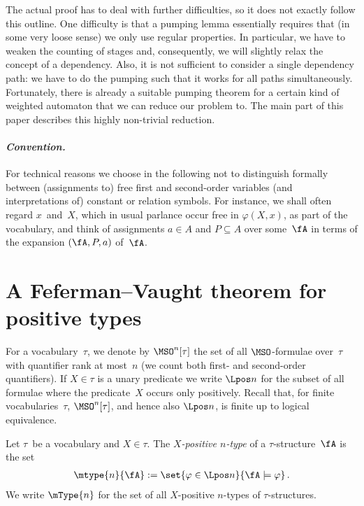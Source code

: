 \documentclass{LMCS}
\begin{document}
The actual proof has to deal with further difficulties,
so it does not exactly follow this outline.
One difficulty is that a pumping lemma essentially requires that
(in some very loose sense) we only use regular properties.
In particular, we have to weaken the counting of stages
and, consequently,
we will slightly relax the concept of a dependency.
Also, it is not sufficient to consider a single dependency path\?:
we have to do the pumping such that it works for all paths simultaneously.
Fortunately, there is already a suitable pumping theorem for a certain kind
of weighted automaton that we can reduce our problem to.
The main part of this paper describes this highly non-trivial reduction.

\paragraph*{\itshape Convention.}
For technical reasons we choose in the following not to distinguish
formally between (assignments to) free first and second-order variables
(and interpretations of) constant or relation symbols. For instance,
we shall often regard $x$~and~$X$, which in usual parlance occur
free in $\varphi(X,x)$, as part of the vocabulary, and think of
assignments $a \in A$ and $P \subseteq A$ over some~$\fA$
in terms of the expansion $(\fA,P,a)$ of~$\fA$.


\section{A Feferman--Vaught theorem for positive types}
\label{sect:Feferman-Vaught}
\label{sect:start I}


For a vocabulary~$\tau$, we denote by
$\MSO^n[\tau]$ the set of all $\MSO$-formulae
over~$\tau$ with quantifier rank at most~$n$
(we count both first- and second-order quantifiers).
If $X \in \tau$ is a unary predicate we write
$\Lpos n$ for the subset of all formulae
where the predicate~$X$ occurs only positively.
Recall that, for finite vocabularies~$\tau$, $\MSO^n[\tau]$,
and hence also $\Lpos n$,
is finite up to logical equivalence.

\begin{defi}
Let $\tau$~be a vocabulary and $X \in \tau$.
The \emph{$X$-positive $n$-type} of a $\tau$-structure~$\fA$ is the set
\begin{align*}
  \mtype{n}{\fA} := \set{ \varphi\in\Lpos n }{ \fA\models\varphi }\,.
\end{align*}
We write $\mType{n}$
for the set of all $X$-positive $n$-types of $\tau$-structures.
\end{defi}
\end{document}
